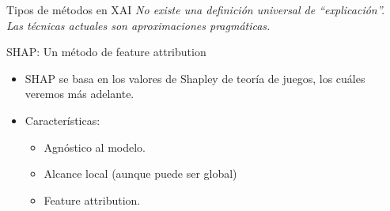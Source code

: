\begin{frame}{Tipos de métodos en XAI}
    \pause
    \textit{No existe una definición universal de ``explicación''. Las técnicas actuales son aproximaciones pragmáticas.}
\end{frame}

\begin{frame}{SHAP: Un método de feature attribution}
    \begin{itemize}[<+- | alert@+>]
        \item SHAP se basa en los valores de Shapley de teoría de juegos, los cuáles veremos más adelante.
        \item Características:
        \begin{itemize}
            \item Agnóstico al modelo.
            \item Alcance local (aunque puede ser global)
            \item Feature attribution.
        \end{itemize}
    \end{itemize}
\end{frame}

